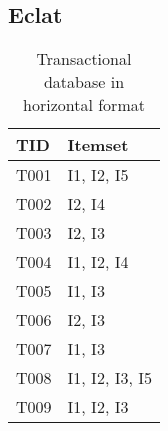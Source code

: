 



\subsection{Eclat}
\begin{table}[]
    \centering
    \begin{tabular}{|l|l|}
    \hline
    TID  & Itemset        \\ \hline
    T001 & I1, I2, I5     \\ \hline
    T002 & I2, I4         \\ \hline
    T003 & I2, I3         \\ \hline
    T004 & I1, I2, I4     \\ \hline
    T005 & I1, I3         \\ \hline
    T006 & I2, I3         \\ \hline
    T007 & I1, I3         \\ \hline
    T008 & I1, I2, I3, I5 \\ \hline
    T009 & I1, I2, I3     \\ \hline
    \end{tabular}
    \caption{Transactional database in horizontal format \citep{han2012mining}}
    \label{tab:horizontal-transactional-database}
\end{table}

